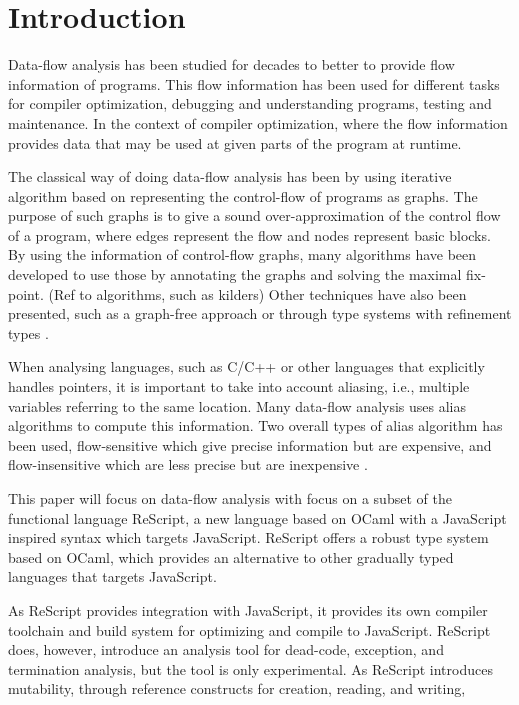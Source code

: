 \documentclass[../../master.tex]{subfiles}
\begin{document}
\section{Introduction}
Data-flow analysis has been studied for decades to better to provide flow information of programs.
This flow information has been used for different tasks for compiler optimization, debugging and understanding programs, testing and maintenance.
In the context of compiler optimization, where the flow information provides data that may be used at given parts of the program at runtime.

The classical way of doing data-flow analysis has been by using iterative algorithm based on representing the control-flow of programs as graphs.
The purpose of such graphs is to give a sound over-approximation of the control flow of a program, where edges represent the flow and nodes represent basic blocks.
By using the information of control-flow graphs, many algorithms have been developed to use those by annotating the graphs and solving the maximal fix-point\cite{KildallGaryA1973Auat, RyderBarbara1988Idaa}. (Ref to algorithms, such as kilders)
Other techniques have also been presented, such as a graph-free approach \cite{HorspoolR.Niegel2002AGAt} or through type systems with refinement types \cite{PavlinovicZvonimir2021Dfrt}.

When analysing languages, such as C/C++ or other languages that explicitly handles pointers, it is important to take into account aliasing, i.e., multiple variables referring to the same location.
Many data-flow analysis uses alias algorithms to compute this information.
Two overall types of alias algorithm has been used, flow-sensitive which give precise information but are expensive, and flow-insensitive which are less precise but are inexpensive \cite{LiangDonglin1999Eaag, EmamiMaryam1994Cipa}.
\bigskip

This paper will focus on data-flow analysis with focus on a subset of the functional language ReScript, a new language based on OCaml with a JavaScript inspired syntax which targets JavaScript.
ReScript offers a robust type system based on OCaml, which provides an alternative to other gradually typed languages that targets JavaScript.\cite{rescript_rebrand}

As ReScript provides integration with JavaScript, it provides its own compiler toolchain and build system for optimizing and compile to JavaScript.
ReScript does, however, introduce an analysis tool for dead-code, exception, and termination analysis, but the tool is only experimental.\cite{reanalyze}
As ReScript introduces mutability, through reference constructs for creation, reading, and writing,
\end{document}
